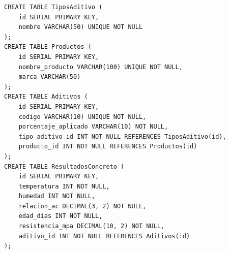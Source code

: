\documentclass[12pt, letterpaper]{article}
\begin{document}
\begin{lstlisting}[style=sqlstyle, caption=Script DDL completo para PostgreSQL.]
CREATE TABLE TiposAditivo (
    id SERIAL PRIMARY KEY,
    nombre VARCHAR(50) UNIQUE NOT NULL
);
CREATE TABLE Productos (
    id SERIAL PRIMARY KEY,
    nombre_producto VARCHAR(100) UNIQUE NOT NULL,
    marca VARCHAR(50)
);
CREATE TABLE Aditivos (
    id SERIAL PRIMARY KEY,
    codigo VARCHAR(10) UNIQUE NOT NULL,
    porcentaje_aplicado VARCHAR(10) NOT NULL,
    tipo_aditivo_id INT NOT NULL REFERENCES TiposAditivo(id),
    producto_id INT NOT NULL REFERENCES Productos(id)
);
CREATE TABLE ResultadosConcreto (
    id SERIAL PRIMARY KEY,
    temperatura INT NOT NULL,
    humedad INT NOT NULL,
    relacion_ac DECIMAL(3, 2) NOT NULL,
    edad_dias INT NOT NULL,
    resistencia_mpa DECIMAL(10, 2) NOT NULL,
    aditivo_id INT NOT NULL REFERENCES Aditivos(id)
);
\end{lstlisting}
\end{document}
